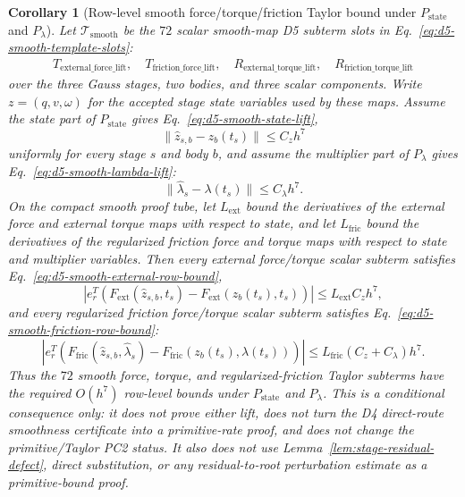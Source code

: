 \documentclass[preprint,12pt]{elsarticle}
\newtheorem{corollary}{Corollary}
\begin{document}
\begin{corollary}[Row-level smooth force/torque/friction Taylor bound under
\(P_{\mathrm{state}}\) and \(P_{\lambda}\)]
\label{cor:d5-smooth-force-row-bound-under-lifts}
Let \(\mathcal T_{\mathrm{smooth}}\) be the \(72\) scalar smooth-map D5
subterm slots in Eq.~\eqref{eq:d5-smooth-template-slots}:
\begin{equation}
\label{eq:d5-smooth-template-slots}
\begin{gathered}
T_{\mathrm{external\_force\_lift}},\quad
T_{\mathrm{friction\_force\_lift}},\quad
R_{\mathrm{external\_torque\_lift}},\quad
R_{\mathrm{friction\_torque\_lift}}
\end{gathered}
\end{equation}
over the three Gauss stages, two bodies, and three scalar components.  Write
\(z=(q,v,\omega)\) for the accepted stage state variables used by these maps.
Assume the state part of \(P_{\mathrm{state}}\) gives
Eq.~\eqref{eq:d5-smooth-state-lift},
\begin{equation}
\label{eq:d5-smooth-state-lift}
  \|\widehat z_{s,b}-z_b(t_s)\|\le C_z h^7
\end{equation}
uniformly for every stage \(s\) and body \(b\), and assume the multiplier
part of \(P_{\lambda}\) gives Eq.~\eqref{eq:d5-smooth-lambda-lift}:
\begin{equation}
\label{eq:d5-smooth-lambda-lift}
  \|\widehat\lambda_s-\lambda(t_s)\|\le C_\lambda h^7 .
\end{equation}
On the compact smooth proof tube, let \(L_{\mathrm{ext}}\) bound the
derivatives of the external force and external torque maps with respect to
state, and let \(L_{\mathrm{fric}}\) bound the derivatives of the regularized
friction force and torque maps with respect to state and multiplier
variables.  Then every external force/torque scalar subterm satisfies
Eq.~\eqref{eq:d5-smooth-external-row-bound},
\begin{equation}
\label{eq:d5-smooth-external-row-bound}
  |e_r^T(F_{\mathrm{ext}}(\widehat z_{s,b},t_s)
        -F_{\mathrm{ext}}(z_b(t_s),t_s))|
  \le L_{\mathrm{ext}}C_z h^7 ,
\end{equation}
and every regularized friction force/torque scalar subterm satisfies
Eq.~\eqref{eq:d5-smooth-friction-row-bound}:
\begin{equation}
\label{eq:d5-smooth-friction-row-bound}
  |e_r^T(F_{\mathrm{fric}}(\widehat z_{s,b},\widehat\lambda_s)
        -F_{\mathrm{fric}}(z_b(t_s),\lambda(t_s)))|
  \le L_{\mathrm{fric}}(C_z+C_\lambda)h^7 .
\end{equation}
Thus the \(72\) smooth force, torque, and regularized-friction Taylor
subterms have the required \(O(h^7)\) row-level bounds under
\(P_{\mathrm{state}}\) and \(P_{\lambda}\).  This is a conditional
consequence only: it does not prove either lift, does not turn the D4
direct-route smoothness certificate into a primitive-rate proof, and does not
change the primitive/Taylor PC2 status.  It also does not use
Lemma~\ref{lem:stage-residual-defect}, direct substitution, or any
residual-to-root perturbation estimate as a primitive-bound proof.
\end{corollary}
\end{document}
